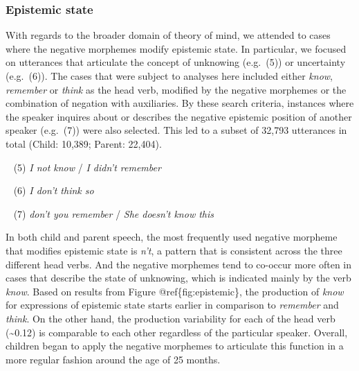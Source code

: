 \documentclass[10pt, letterpaper]{article}
\begin{document}
\hypertarget{epistemic-state}{%
\subsubsection{Epistemic state}\label{epistemic-state}}

With regards to the broader domain of theory of mind, we attended to
cases where the negative morphemes modify epistemic state. In
particular, we focused on utterances that articulate the concept of
unknowing (e.g.~(5)) or uncertainty (e.g.~(6)). The cases that were
subject to analyses here included either \emph{know}, \emph{remember} or
\emph{think} as the head verb, modified by the negative morphemes or the
combination of negation with auxiliaries. By these search criteria,
instances where the speaker inquires about or describes the negative
epistemic position of another speaker (e.g.~(7)) were also selected.
This led to a subset of 32,793 utterances in total (Child: 10,389;
Parent: 22,404).

~ (5) \emph{I not know} / \emph{I didn't remember}

~ (6) \emph{I don't think so}

~ (7) \emph{don't you remember} / \emph{She doesn't know this}

In both child and parent speech, the most frequently used negative
morpheme that modifies epistemic state is \emph{n't}, a pattern that is
consistent across the three different head verbs. And the negative
morphemes tend to co-occur more often in cases that describe the state
of unknowing, which is indicated mainly by the verb \emph{know}. Based
on results from Figure @ref\{fig:epistemic\}, the production of
\emph{know} for expressions of epistemic state starts earlier in
comparison to \emph{remember} and \emph{think}. On the other hand, the
production variability for each of the head verb (\textasciitilde0.12)
is comparable to each other regardless of the particular speaker.
Overall, children began to apply the negative morphemes to articulate
this function in a more regular fashion around the age of 25 months.
\end{document}
